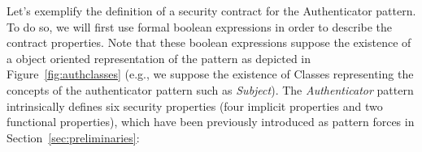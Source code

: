 
Let’s exemplify the definition of a security contract for the Authenticator pattern. To do so, we will first use formal boolean expressions in order to describe the contract properties. Note that these boolean expressions suppose the existence of a object oriented representation of the pattern as depicted in Figure~\ref{fig:authclasses} (e.g., we suppose the existence of Classes representing the concepts of the authenticator pattern such as \emph{Subject}). The \textit{Authenticator} pattern intrinsically defines six security properties (four implicit properties and two functional properties), which have been previously introduced as pattern forces in Section~\ref{sec:preliminaries}: 

